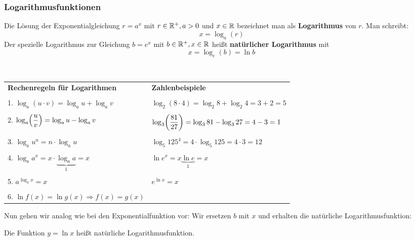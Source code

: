 \documentclass[ngerman, 12pt]{nssheetxea}
\begin{document}
\subsubsection{Logarithmusfunktionen}
\begin{definition}
Die Lösung der Exponentialgleichung $r=a^x$ mit $r\in \mathbb{R}^+, a>0$ und $x\in \mathbb{R}$ bezeichnet man als \textbf{Logarithmus} von $r$. Man schreibt:
\[ x=\log_a(r)  \]
Der spezielle Logarithmus zur Gleichung $b=e^x$ mit $b \in \mathbb{R}^+, x\in \mathbb{R}$ heißt \textbf{natürlicher Logarithmus} mit 
\[ x= \log_e(b) = \ln b \]
\label{Def:Logarithmus}
 
\end{definition}

\begin{theorem} \ \par

\begin{tabularx}{\textwidth}{X X}
\setstretch{2}
\textbf{Rechenregeln für Logarithmen} & \textbf{Zahlenbeispiele} \\
\\
1.   $\log_a (u\cdot v) = \log_a u + \log_a v$ & $\log_2 (8\cdot 4) = \log_2 8 + \log_2 4 = 3+2=5$ \\
\\
2.   $\log_a\mleft( \dfrac{u}{v} \mright) = \log_a u - \log_a v$ & $\log_3\mleft( \dfrac{81}{27} \mright) = \log_3 81 - \log_3 27=4-3=1$ \\
\\
3.   $\log_a u^n = n \cdot \log_a u$ & $\log_5 125^4 = 4 \cdot \log_5 125=4\cdot 3 = 12$ \\
\\
4.   $\log_a a^x = x \cdot \underbrace{\log_a a}_1 = x$ & $\ln e^x = x \underbrace{\ln e}_1 = x$ \\
\\
5.   $a^{\log_a x} = x$ & $e^{\ln x} = x$ \\
\\
6.   $\ln f(x) = \ln g(x) \Rightarrow f(x) = g(x)$ 

\end{tabularx}
\end{theorem}

Nun gehen wir analog wie bei den Exponentialfunktion vor: Wir ersetzen $b$ mit $x$ und erhalten die natürliche Logarithmusfunktion:

\begin{definition}

Die Funktion $y=\ln x$ heißt natürliche Logarithmusfunktion.  

\end{definition}
\end{document}
